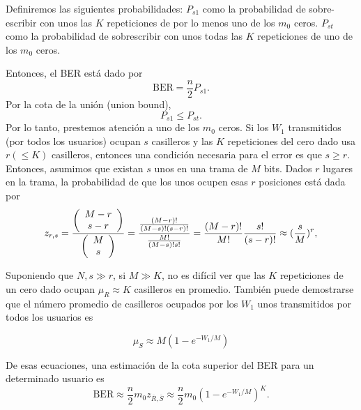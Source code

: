 Definiremos las siguientes probabilidades: 
$P_{s1}$ como la probabilidad de sobre-escribir con unos las $K$ repeticiones de por lo menos uno de los $m_0$ ceros.
$P_{st}$ como la probabilidad de sobrescribir con unos todas las $K$ repeticiones de uno de los $m_0$ ceros.

Entonces, el BER está dado por
\begin{equation}
\text{BER} = \frac{n}{2}P_{s1}.
\label{eq:ber_01}
\end{equation}
Por la cota de la unión (union bound), 
\begin{equation}
P_{s1}\leq P_{st}.
\label{eq:union_bound}
\end{equation}
Por lo tanto, prestemos atención a uno de los $m_0$ ceros. Si los $W_{1}$ transmitidos (por todos los usuarios) ocupan $s$ casilleros y las $K$ repeticiones del cero dado usa $r ( \leq K)$ casilleros, entonces una condición necesaria para el error es que $s \geq r$. Entonces, asumimos que existan $s$ unos en una trama de $M$ bits. Dados $r$ lugares en la trama, la probabilidad de que los unos ocupen esas $r$ posiciones está dada por 
\begin{equation}
z_{r,s} = \frac{\left(\begin{array}{c} M-r \\ s-r\end{array}\right)}{\left(\begin{array}{c} M \\ s\end{array}\right)}= \frac{\frac{(M-r)!}{(M-s)! (s-r)!}}{\frac{M!}{(M-s)!s!}} = \frac{(M-r)!}{M!}\frac{s!}{(s-r)!}\approx (\frac{s}{M})^r,
\end{equation}

Suponiendo que $N,s\gg r$, si $M \gg K$, no es difícil ver que las $K$ repeticiones de un cero dado ocupan $\mu_{R} \approx K$ casilleros en promedio. También puede demostrarse que el número promedio de casilleros ocupados por los $W_{1}$ unos transmitidos por todos los usuarios es

\begin{equation}
\mu_{S} \approx M (1-e^{-W_1/M})
\end{equation}
 
De esas ecuaciones, una estimación de la cota superior del BER para un determinado usuario es
\begin{equation}
\text{BER} \approx \frac{n}{2} m_0 z_{\bar{R},\bar{S}} \approx \frac{n}{2} m_0 \left(1-e^{-W_1/M}\right)^K.
\end{equation}

